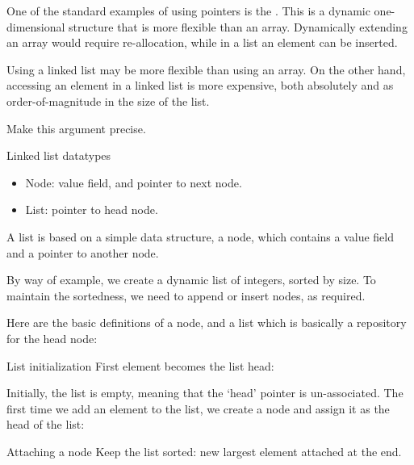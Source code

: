One of the standard examples of using pointers is the
. This is a dynamic one-dimensional structure
that is more flexible than an array. Dynamically extending an array
would require re-allocation, while in a list an element can be
inserted.

\begin{exercise}
  Using a linked list may be more flexible than using an array.
  On the other hand, accessing an element in a linked list is
  more expensive, both absolutely and as order-of-magnitude in the size
  of the list.

  Make this argument precise.
\end{exercise}

\begin{block}{Linked list datatypes}
  \label{sl:flink2}
  \begin{itemize}
  \item Node: value field, and pointer to next node.
  \item List: pointer to head node.
  \end{itemize}
\end{block}

A list is based on a simple data structure, a node, which contains a
value field and a pointer to another node.

By way of example, we create a dynamic list of integers, sorted by
size. To maintain the sortedness, we need to append or insert nodes,
as required.

Here are the basic definitions of a node, and a list which is
basically a repository for the head node:
%

\begin{block}{List initialization}
  \label{sl:flink3}
  First element becomes the list head:

  
\end{block}

Initially, the list is empty, meaning that the `head' pointer is
un-associated. The first time we add an element to the list, we create
a node and assign it as the head of the list:
%

\begin{block}{Attaching a node}
  \label{sl:flink4}
  Keep the list sorted: new largest element attached at the end.
  
\end{block}

